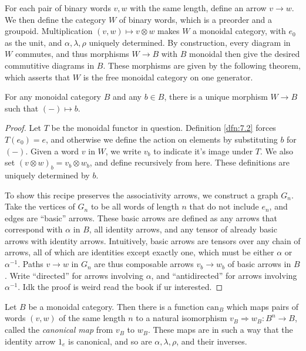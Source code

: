 For each pair of binary words $v,w$ with the same length, define an arrow $v\to w$. We then define the category $W$ of binary words, which is a preorder and a groupoid. Multiplication $(v,w)\mapsto v\otimes w$ makes $W$ a monoidal category, with $e_0$ as the unit, and $\alpha,\lambda,\rho$ uniquely determined. By construction, every diagram in $W$ commutes, and thus morphisms $W\to B$ with $B$ monoidal then give the desired commutitive diagrams in $B$. These morphisms are given by the following theorem, which asserts that $W$ is the free monoidal category on one generator.

\begin{theorem}\label{thm:7.1}
	For any monoidal category $B$ and any $b\in B$, there is a unique morphism $W\to B$ such that $(-)\mapsto b$.
\end{theorem}
\begin{proof}
	Let $T$ be the monoidal functor in question. Definition \ref{dfn:7.2} forces $T(e_0)=e$, and otherwise we define the action on elements by substituting $b$ for $(-)$. Given a word $v$ in $W$, we write $v_b$ to indicate it's image under $T$. We also set $(v\otimes w)_b=v_b \otimes w_b$, and define recursively from here. These definitions are uniquely determined by $b$.

	To show this recipe preserves the associativity arrows, we construct a graph $G_n$. Take the vertices of $G_n$ to be all words of length $n$ that do not include $e_n$, and edges are ``basic'' arrows. These basic arrows are defined as any arrows that correspond with $\alpha$ in $B$, all identity arrows, and any tensor of already basic arrows with identity arrows. Intuitively, basic arrows are tensors over any chain of arrows, all of which are identities except exactly one, which must be either $\alpha$ or $\alpha ^{-1} $. Paths $v\to w$ in $G_n$ are thus composable arrows $v_b \to w_b$ of basic arrows in $B$. Write ``directed'' for arrows involving $\alpha$, and ``antidirected'' for arrows involving $\alpha ^{-1} $. Idk the proof is weird read the book if ur interested.
\end{proof}
\begin{corollary}\label{cor:7.1}
	Let $B$ be a monoidal category. Then there is a function $\mathrm{can} _B$ which maps pairs of words $(v,w)$ of the same length $n$ to a natural isomorphism $v_B\Rightarrow w_B : B^n \to B$, called the \emph{canonical map} from $v_B$ to $w_B$. These maps are in such a way that the identity arrow $1_e$ is canonical, and so are $\alpha,\lambda,\rho$, and their inverses.
\end{corollary}

